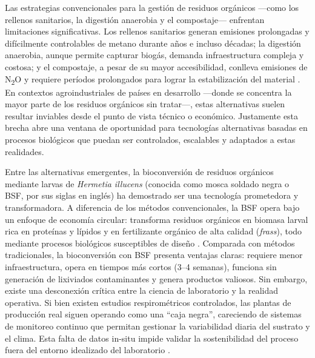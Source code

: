 Las estrategias convencionales para la gestión de residuos orgánicos —como los rellenos sanitarios, la digestión anaerobia y el compostaje— enfrentan limitaciones significativas. Los rellenos sanitarios generan emisiones prolongadas y difícilmente controlables de metano durante años e incluso décadas; la digestión anaerobia, aunque permite capturar biogás, demanda infraestructura compleja y costosa; y el compostaje, a pesar de su mayor accesibilidad, conlleva emisiones de N\textsubscript{2}O y requiere períodos prolongados para lograr la estabilización del material \parencite{kongEvaluatingGreenhouseGas2012,nordahlGreenhouseGasAir2023a}. En contextos agroindustriales de países en desarrollo —donde se concentra la mayor parte de los residuos orgánicos sin tratar—, estas alternativas suelen resultar inviables desde el punto de vista técnico o económico. Justamente esta brecha abre una ventana de oportunidad para tecnologías alternativas basadas en procesos biológicos que puedan ser controlados, escalables y adaptados a estas realidades.

Entre las alternativas emergentes, la bioconversión de residuos orgánicos mediante larvas de \textit{Hermetia illucens} (conocida como mosca soldado negra o BSF, por sus siglas en inglés) ha demostrado ser una tecnología prometedora y transformadora. A diferencia de los métodos convencionales, la BSF opera bajo un enfoque de economía circular: transforma residuos orgánicos en biomasa larval rica en proteínas y lípidos y en fertilizante orgánico de alta calidad (\textit{frass}), todo mediante procesos biológicos susceptibles de diseño \parencite{bermudez-serranoComprehensiveUtilizationBlack2023,surendraBioconversionOrganicWastes2016}. Comparada con métodos tradicionales, la bioconversión con BSF presenta ventajas claras: requiere menor infraestructura, opera en tiempos más cortos (3--4 semanas), funciona sin generación de lixiviados contaminantes y genera productos valiosos. Sin embargo, existe una desconexión crítica entre la ciencia de laboratorio y la realidad operativa. Si bien existen estudios respirométricos controlados, las plantas de producción real siguen operando como una ``caja negra'', careciendo de sistemas de monitoreo continuo que permitan gestionar la variabilidad diaria del sustrato y el clima. Esta falta de datos in-situ impide validar la sostenibilidad del proceso fuera del entorno idealizado del laboratorio \parencite{jenkinsProcessingPoultryManure2025}.

